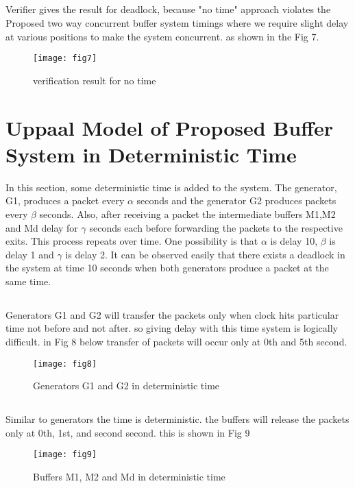 \documentclass[letterpaper]{article}
\begin{document}
\subsection{} Verifier gives the result for deadlock, because "no time" approach violates the Proposed two way concurrent buffer system timings where we require slight delay at various positions to make the system concurrent. as shown in the Fig 7.
\begin{figure}[bpht!]
\centering
	\texttt{[image: fig7]}
		\caption{verification result for no time}
	\label{Fig 7}
\end{figure}



\section{Uppaal Model of Proposed Buffer System in Deterministic Time}
\label{9}
In this section, some deterministic time is added to the system. The generator, G1, produces a packet every $\alpha$ seconds and the generator G2 produces packets every $\beta$ seconds. Also, after receiving a packet the intermediate buffers M1,M2 and Md delay for $\gamma$ seconds each before forwarding the packets to the respective exits. This process repeats over time. One possibility is that $\alpha$ is delay 10, $\beta$ is delay 1 and $\gamma$ is delay 2. It can be observed easily that there exists a deadlock in the system at time 10 seconds when both generators produce a packet at the same time.

\subsection{} Generators G1 and G2 will transfer the packets only when clock hits particular time not before and not after. so giving delay with this time system is logically difficult. in Fig 8 below transfer of packets will occur only at 0th and 5th second.
\begin{figure}[bpht!]
\centering
	\texttt{[image: fig8]}
		\caption{Generators G1 and G2 in deterministic time}
	\label{Fig 8}
\end{figure}

\subsection{} Similar to generators the time is deterministic. the buffers will release the packets only at 0th, 1st, and second second. this is shown in Fig 9
\begin{figure}[bpht!]
\centering
	\texttt{[image: fig9]}
		\caption{Buffers M1, M2 and Md in deterministic time}
	\label{Fig 9}
\end{figure}
\end{document}
